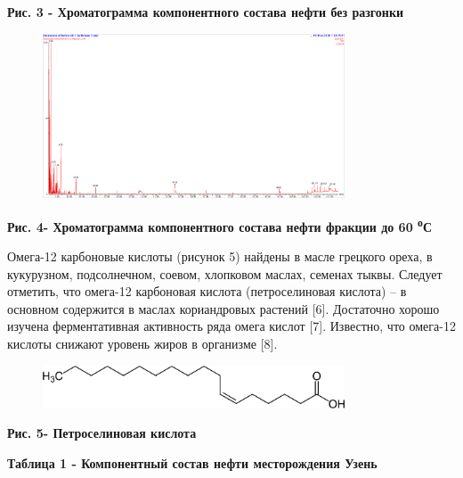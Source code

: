 {\bfseries Рис. 3 - Хроматограмма компонентного состава нефти без разгонки}

\begin{figure}[H]
	\centering
	\includegraphics[width=0.8\textwidth]{assets/371}
	\caption*{}
\end{figure}

{\bfseries Рис. 4- Хроматограмма компонентного состава нефти фракции до 60
\textsuperscript{о}С}

Омега-12 карбоновые кислоты (рисунок 5) найдены в масле грецкого ореха,
в кукурузном, подсолнечном, соевом, хлопковом маслах, семенах тыквы.
Следует отметить, что омега-12 карбоновая кислота (петроселиновая
кислота) -- в основном содержится в маслах кориандровых растений
{[}6{]}. Достаточно хорошо изучена ферментативная активность ряда омега
кислот {[}7{]}. Известно, что омега-12 кислоты снижают уровень жиров в
организме {[}8{]}.

\begin{figure}[H]
	\centering
	\includegraphics[width=0.8\textwidth]{assets/372}
	\caption*{}
\end{figure}

{\bfseries Рис. 5- Петроселиновая кислота}

{\bfseries Таблица 1 - Компонентный состав нефти месторождения Узень}

